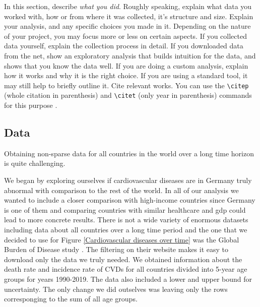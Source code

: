 In this section, describe \emph{what you did}. Roughly speaking, explain what data you worked with, how or from where it was collected, it's structure and size. Explain your analysis, and any specific choices you made in it. Depending on the nature of your project, you may focus more or less on certain aspects. If you collected data yourself, explain the collection process in detail. If you downloaded data from the net, show an exploratory analysis that builds intuition for the data, and shows that you know the data well. If you are doing a custom analysis, explain how it works and why it is the right choice. If you are using a standard tool, it may still help to briefly outline it. Cite relevant works. You can use the \verb|\citep| (whole citation in parenthesis) and \verb|\citet| (only year in parenthesis) commands for this purpose \citep{mackay2003information}.

% 

\subsection{Data}
Obtaining non-sparse data for all countries in the world over a long time horizon is quite challenging.

We began by exploring ourselves if cardiovascular diseases are in Germany truly abnormal with comparison to the rest of the world. In all of our analysis we wanted to include a closer comparison with high-income countries since Germany is one of them and comparing countries with similar healthcare and gdp could lead to more concrete results. There is not a wide variety of enormous datasets including data about all countries over a long time period and the one that we decided to use for Figure \ref{Cardiovascular diseases over time} was the Global Burden of Disease study \citep{GBD2019}. The filtering on their website makes it easy to download only the data we truly needed. We obtained information about the death rate and incidence rate of CVDs for all countries divided into 5-year age groups for years 1990-2019. The data also included a lower and upper bound for uncertainty. The only change we did outselves was leaving only the rows corresponging to the sum of all age groups.

